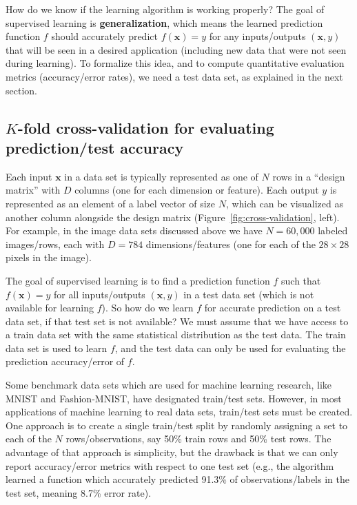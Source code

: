 \documentclass[12pt]{article}
\newcommand{\keyword}[1]{\textbf{#1}}
\begin{document}
How do we know if the learning algorithm is working properly? The goal
of supervised learning is \keyword{generalization}, which means the
learned prediction function $f$ should accurately predict
$f(\mathbf x) = y$ for any inputs/outputs $(\mathbf x,y)$ that will be
seen in a desired application (including new data that were not seen
during learning). To formalize this idea, and to compute quantitative
evaluation metrics (accuracy/error rates), we need a test data set, as
explained in the next section.

\subsection{$K$-fold cross-validation for evaluating prediction/test accuracy}

Each input $\mathbf x$ in a data set is typically represented as one
of $N$ rows in a ``design matrix'' with $D$ columns (one for each
dimension or feature). Each output $y$ is represented as an element of
a label vector of size $N$, which can be visualized as another column
alongside the design matrix (Figure~\ref{fig:cross-validation},
left). For example, in the image data sets discussed above we have
$N=60,000$ labeled images/rows, each with $D=784$ dimensions/features
(one for each of the $28\times 28$ pixels in the image).

The goal of supervised learning is to find a prediction function $f$
such that $f(\mathbf x) = y$ for all inputs/outputs $(\mathbf x,y)$ in
a test data set (which is not available for learning
$f$). So how do we learn $f$ for accurate prediction on a test data
set, if that test set is not available? We must assume that we have
access to a train data set with the same statistical distribution as
the test data. The train data set is used to learn $f$, and the test
data can only be used for evaluating the prediction accuracy/error of
$f$.

Some benchmark data sets which are used for machine learning research,
like MNIST and Fashion-MNIST, have designated train/test
sets. However, in most applications of machine learning to real data
sets, train/test sets must be created. One approach is to create a
single train/test split by randomly assigning a set to each of the $N$
rows/observations, say 50\% train rows and 50\% test rows. The
advantage of that approach is simplicity, but the drawback is that we
can only report accuracy/error metrics with respect to one test set
(e.g., the algorithm learned a function which accurately predicted
91.3\% of observations/labels in the test set, meaning 8.7\% error
rate). 
\end{document}
